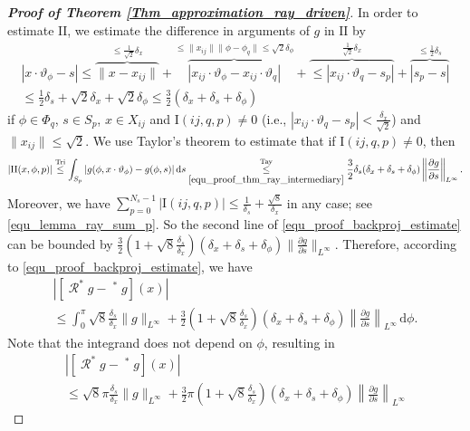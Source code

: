 \documentclass[11pt,reqno]{amsart}
\newcommand{\sums}{\sum_{p=0}^{N_s-1}}
\newcommand{\I}{\mathrm{I}}
\newcommand{\II}{\mathrm{II}}
\DeclareMathOperator{\Radon}{\mathcal{R}}
\DeclareMathOperator{\RayRadon}{\mathcal{R}^\mathrm{rd}_{\delta}}
\newcommand{\dd}[1]{\,\mathrm{d}{#1}}
\numberwithin{theorem}{section}
\theoremstyle{remark}
\begin{document}
\begin{proof}[\textbf{Proof of Theorem \ref{Thm_approximation_ray_driven}}]
  In order to estimate $\II$, we estimate the difference in arguments of $g$ in $\II$ by
    \begin{multline}\label{equ_proof_thm_ray_intermediary}
    |x\cdot \vartheta_\phi-s|\leq \overbrace{\|x-x_{ij}\|}^{\leq \frac{1}{\sqrt{2}}\delta_x} + \overbrace{|x_{ij}\cdot\vartheta_\phi-x_{ij}\cdot\vartheta_q|}^{\leq \|x_{ij}\| \|\phi-\phi_q\| \leq \sqrt{2} \delta_\phi}+\overbrace{\leq |x_{ij}\cdot\vartheta_q-s_p|}^{\frac{1}{\sqrt{2}}\delta_x}+\overbrace{|s_p-s|}^{\leq \frac{1}{2}\delta_s}
    \\
    \leq \frac{1}{2}\delta_s+\sqrt{2}\delta_x+\sqrt{2}\delta_\phi\leq \frac{3}{2}(\delta_x+\delta_s+\delta_\phi)
    \end{multline}
    if $\phi\in \Phi_q$, $s\in S_p$, $x\in X_{ij}$  and $\I(ij,q,p)\neq 0$ (i.e., $| x_{ij}\cdot \vartheta_q-s_p|<\frac{\delta_x}{\sqrt{2}}$) and $\|x_{ij}\|\leq \sqrt{2}$.   We use Taylor's theorem to estimate that if $\I(ij,q,p)\neq 0$, then
\begin{equation}\label{equ_proof_thm_ray_secondterm}
|\II(x,\phi,p)| \overset{\text{Tri}}{\leq } \int_{S_p} |g(\phi,x\cdot \vartheta_\phi)- g(\phi,s)| \dd s  \overset{\text{Tay}}{\underset{\eqref{equ_proof_thm_ray_intermediary}}{\leq}} \frac{3}{2}\delta_s(\delta_x+\delta_s+\delta_\phi) \left \|\frac{\partial g}{\partial s} \right \|_{L^\infty}.
\end{equation}   
Moreover,  we have $\sums |\I(ij,q,p)|\leq \frac{1}{\delta_s}+{\frac{\sqrt{8}}{\delta_x}}$ in any case; see \eqref{equ_lemma_ray_sum_p}. So the second line of \eqref{equ_proof_backproj_estimate} can be bounded by $\frac{3}{2}(1+\sqrt{8}\frac{\delta_s}{\delta_x})(\delta_x+\delta_s+\delta_\phi)\|\frac{\partial g}{\partial s}\|_{L^\infty}$.
Therefore, according to \eqref{equ_proof_backproj_estimate}, we have
\begin{multline}
   \left| [\Radon^* g- \RayRadon^* g](x)\right|\\\leq \int_0^{\pi} \sqrt{8} \frac{\delta_s}{\delta_x} \|g\|_{L^\infty} + 
     \frac{3}{2} \left (1+\sqrt{8}\frac{\delta_s}{\delta_x} \right) (\delta_x+\delta_s+\delta_\phi) \left \|\frac{\partial g}{\partial s} \right \|_{L^\infty}  \dd \phi .
\end{multline}
         Note that the integrand does not depend on $\phi$, resulting in
    \begin{multline} \label{equ_proof_estimate_ray-driven_backprojection}
   \left| [\Radon^* g- \RayRadon^* g](x)\right| \\\leq \sqrt{8} \pi \frac{\delta_s}{\delta_x} \|g\|_{L^\infty}+ \frac{3}{2} \pi  \left (1+\sqrt{8}\frac{\delta_s}{\delta_x} \right) (\delta_x+\delta_s+\delta_\phi) \left \|\frac{\partial g}{\partial s} \right \|_{L^\infty}

\end{multline}
\end{proof}
\end{document}
